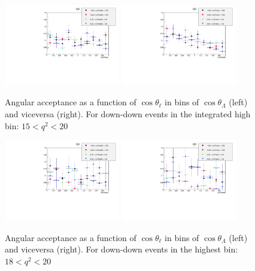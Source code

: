 \begin{figure}[h!]
\includegraphics[width=0.45\textwidth]{Lmumu/figs/effs/DDeff_highq2.pdf}
\includegraphics[width=0.45\textwidth]{Lmumu/figs/effs/DDBeff_highq2.pdf} 
\caption{Angular acceptance as a function of $\cos\theta_\ell$ in bins of $\cos\theta_\Lambda$ (left) and viceversa (right). For down-down events in the integrated high \qsq bin: $15 < q^2 < 20$}
\end{figure}

\begin{figure}[h!]
\includegraphics[width=0.45\textwidth]{Lmumu/figs/effs/DDeff_highestq2.pdf}
\includegraphics[width=0.45\textwidth]{Lmumu/figs/effs/DDBeff_highestq2.pdf} 
\caption{Angular acceptance as a function of $\cos\theta_\ell$ in bins of $\cos\theta_\Lambda$ (left) and viceversa (right). For down-down events in the highest \qsq bin: $18 < q^2 < 20$}
\end{figure}




